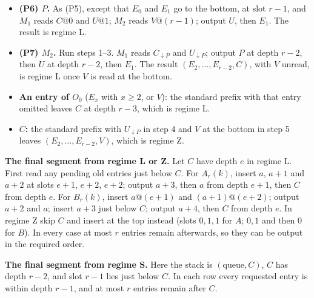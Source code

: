 \documentclass[11pt,letterpaper]{article}
\begin{document}
\begin{itemize}
  \(U@1\) and \(V@(r-1)\), giving \((C,U,E_2,\dots,E_{r-2},V,E_1)\).
  Output \(U\) at depth \(1\) and \(E_1\) at depth \(r-1\). The result
  is regime L.
\item
  \textbf{(P6) \(P\).} As (P5), except that \(E_0\) and \(E_1\) go to
  the bottom, at slot \(r-1\), and \(M_1\) reads \(C@0\) and \(U@1\);
  \(M_2\) reads \(V@(r-1)\); output \(U\), then \(E_1\). The result is
  regime L.
\item
  \textbf{(P7) \(M_2\).} Run steps 1--3. \(M_1\) reads
  \(C_{\downarrow P}\) and \(U_{\downarrow P}\); output \(P\) at depth
  \(r-2\), then \(U\) at depth \(r-2\), then \(E_1\). The result
  \((E_2,\dots,E_{r-2},C)\), with \(V\) unread, is regime L once \(V\)
  is read at the bottom.
\item
  \textbf{An entry of \(O_0\)} (\(E_x\) with \(x\ge2\), or \(V\)): the
  standard prefix with that entry omitted leaves \(C\) at depth \(r-3\),
  which is regime L.
\item
  \textbf{\(C\):} the standard prefix with \(U_{\downarrow P}\) in step
  4 and \(V\) at the bottom in step 5 leaves \((E_2,\dots,E_{r-2},V)\),
  which is regime Z.
\end{itemize}

\textbf{The final segment from regime L or Z.} Let \(C\) have depth
\(e\) in regime L. First read any pending old entries just below \(C\).
For \(A_r(k)\), insert \(a\), \(a+1\) and \(a+2\) at slots \(e+1\),
\(e+2\), \(e+2\); output \(a+3\), then \(a\) from depth \(e+1\), then
\(C\) from depth \(e\). For \(B_r(k)\), insert \(a@(e+1)\) and
\((a+1)@(e+2)\); output \(a+2\) and \(a\); insert \(a+3\) just below
\(C\); output \(a+4\), then \(C\) from depth \(e\). In regime Z skip
\(C\) and insert at the top instead (slots \(0,1,1\) for \(A\); \(0,1\)
and then \(0\) for \(B\)). In every case at most \(r\) entries remain
afterwards, so they can be output in the required order.

\textbf{The final segment from regime S.} Here the stack is
\((\text{queue},C)\), \(C\) has depth \(r-2\), and slot \(r-1\) lies
just below \(C\). In each row every requested entry is within depth
\(r-1\), and at most \(r\) entries remain after \(C\).
\end{document}
